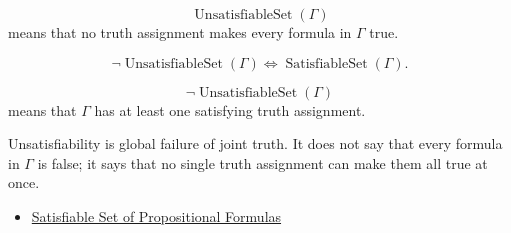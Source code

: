 \begin{remark*}
\[
\operatorname{UnsatisfiableSet}(\Gamma)
\]
means that no truth assignment makes every formula in \(\Gamma\) true.
\end{remark*}

\begin{remark*}
\[
\neg\operatorname{UnsatisfiableSet}(\Gamma)
\Longleftrightarrow
\operatorname{SatisfiableSet}(\Gamma).
\]
\end{remark*}

\begin{remark*}
\[
\neg\operatorname{UnsatisfiableSet}(\Gamma)
\]
means that \(\Gamma\) has at least one satisfying truth assignment.
\end{remark*}

\begin{remark*}[Interpretation]
Unsatisfiability is global failure of joint truth. It does not say that every
formula in \(\Gamma\) is false; it says that no single truth assignment can
make them all true at once.
\end{remark*}

\begin{dependencies}
\begin{itemize}
  \item \hyperref[def:satisfiable-set-of-propositional-formulas]{Satisfiable Set of Propositional Formulas}
\end{itemize}
\end{dependencies}

